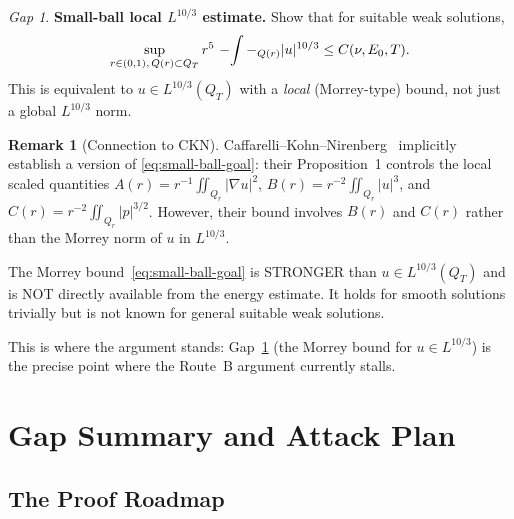 \documentclass[11pt]{article}
\theoremstyle{definition}
\newtheorem{remark}[theorem]{Remark}
\theoremstyle{remark}
\newtheorem{gap}[theorem]{\color{red}Gap}
\newcommand{\grad}{\nabla}
\newcommand{\Xint}{\mathop{\mathchoice{\vcenter{\hbox{$\displaystyle-$}}}%
  {\vcenter{\hbox{$\textstyle-$}}}%
  {\vcenter{\hbox{$\scriptstyle-$}}}%
  {\vcenter{\hbox{$\scriptscriptstyle-$}}}}\!\int}
\begin{document}
\begin{gap}\label{gap:small-ball}
  \textbf{Small-ball local $L^{10/3}$ estimate.}
  Show that for suitable weak solutions,
  \begin{equation}\label{eq:small-ball-goal}
    \sup_{r\in(0,1),\,Q(r)\subset Q_T}
    r^5\,\Xint-_{Q(r)}|u|^{10/3} \leq C(\nu,E_0,T).
  \end{equation}
  This is equivalent to $u\in L^{10/3}(Q_T)$ with a \emph{local} (Morrey-type)
  bound, not just a global $L^{10/3}$ norm.
\end{gap}

\begin{remark}[Connection to CKN]
  Caffarelli--Kohn--Nirenberg~\cite{CKN1982} implicitly establish a version of
  \eqref{eq:small-ball-goal}: their Proposition~1 controls the local scaled
  quantities $A(r) = r^{-1}\iint_{Q_r}|\grad u|^2$, $B(r) = r^{-2}\iint_{Q_r}|u|^3$,
  and $C(r) = r^{-2}\iint_{Q_r}|p|^{3/2}$.  However, their bound involves
  $B(r)$ and $C(r)$ rather than the Morrey norm of $u$ in $L^{10/3}$.

  The Morrey bound~\eqref{eq:small-ball-goal} is STRONGER than $u\in L^{10/3}(Q_T)$
  and is NOT directly available from the energy estimate.  It holds for smooth
  solutions trivially but is not known for general suitable weak solutions.

  This is where the argument stands: Gap~\ref{gap:small-ball} (the Morrey bound
  for $u\in L^{10/3}$) is the precise point where the Route~B argument
  currently stalls.
\end{remark}

\section{Gap Summary and Attack Plan}
\label{sec:attack}

\subsection{The Proof Roadmap}
\end{document}
